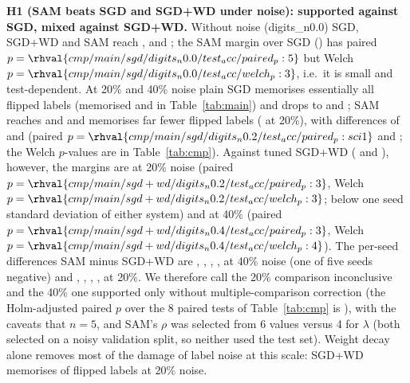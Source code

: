 \textbf{H1 (SAM beats SGD and SGD+WD under noise): supported against SGD, mixed against SGD+WD.}
Without noise (digits\_n0.0) SGD, SGD+WD and SAM reach ,  and ; the SAM margin over SGD () has paired $p=\rhval{cmp/main/sgd/digits_n0.0/test_acc/paired_p:5}$ but Welch $p=\rhval{cmp/main/sgd/digits_n0.0/test_acc/welch_p:3}$, i.e.\ it is small and test-dependent. At 20\% and 40\% noise plain SGD memorises essentially all flipped labels (memorised  and  in Table~\ref{tab:main}) and drops to  and ; SAM reaches  and  and memorises far fewer flipped labels ( at 20\%), with differences of  and  (paired $p=\rhval{cmp/main/sgd/digits_n0.2/test_acc/paired_p:sci1}$ and ; the Welch $p$-values are in Table~\ref{tab:cmp}). Against tuned SGD+WD ( and ), however, the margins are  at 20\% noise (paired $p=\rhval{cmp/main/sgd+wd/digits_n0.2/test_acc/paired_p:3}$, Welch $p=\rhval{cmp/main/sgd+wd/digits_n0.2/test_acc/welch_p:3}$; below one seed standard deviation of either system) and  at 40\% (paired $p=\rhval{cmp/main/sgd+wd/digits_n0.4/test_acc/paired_p:3}$, Welch $p=\rhval{cmp/main/sgd+wd/digits_n0.4/test_acc/welch_p:4}$). The per-seed differences SAM minus SGD+WD are , , , ,  at 40\% noise (one of five seeds negative) and , , , ,  at 20\%. We therefore call the 20\% comparison inconclusive and the 40\% one supported only without multiple-comparison correction (the Holm-adjusted paired $p$ over the 8 paired tests of Table~\ref{tab:cmp} is ), with the caveats that $n=5$, and SAM's $\rho$ was selected from 6 values versus 4 for $\lambda$ (both selected on a noisy validation split, so neither used the test set). Weight decay alone removes most of the damage of label noise at this scale: SGD+WD memorises  of flipped labels at 20\% noise.


